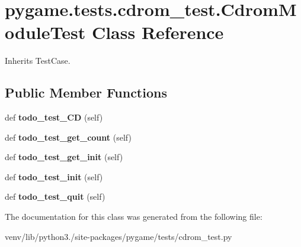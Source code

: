 \hypertarget{classpygame_1_1tests_1_1cdrom__test_1_1_cdrom_module_test}{}\section{pygame.\+tests.\+cdrom\+\_\+test.\+Cdrom\+Module\+Test Class Reference}
\label{classpygame_1_1tests_1_1cdrom__test_1_1_cdrom_module_test}


Inherits Test\+Case.

\subsection*{Public Member Functions}
\begin{DoxyCompactItemize}
\item 
\mbox{\label{classpygame_1_1tests_1_1cdrom__test_1_1_cdrom_module_test_a082a56bb297891638bd416d5d9da34e8}} 
def {\bfseries todo\+\_\+test\+\_\+\+CD} (self)
\item 
\mbox{\label{classpygame_1_1tests_1_1cdrom__test_1_1_cdrom_module_test_a6d507601db41f986535ed1e007903fe9}} 
def {\bfseries todo\+\_\+test\+\_\+get\+\_\+count} (self)
\item 
\mbox{\label{classpygame_1_1tests_1_1cdrom__test_1_1_cdrom_module_test_a95ef36d5195a6934a3749c3fd543e4ef}} 
def {\bfseries todo\+\_\+test\+\_\+get\+\_\+init} (self)
\item 
\mbox{\label{classpygame_1_1tests_1_1cdrom__test_1_1_cdrom_module_test_a869a25c8fa299add3441124e452b4a0f}} 
def {\bfseries todo\+\_\+test\+\_\+init} (self)
\item 
\mbox{\label{classpygame_1_1tests_1_1cdrom__test_1_1_cdrom_module_test_a425a529309e01eb59202366ac44776ca}} 
def {\bfseries todo\+\_\+test\+\_\+quit} (self)
\end{DoxyCompactItemize}


The documentation for this class was generated from the following file\+:\begin{DoxyCompactItemize}
\item 
venv/lib/python3./site-\/packages/pygame/tests/cdrom\+\_\+test.\+py\end{DoxyCompactItemize}
